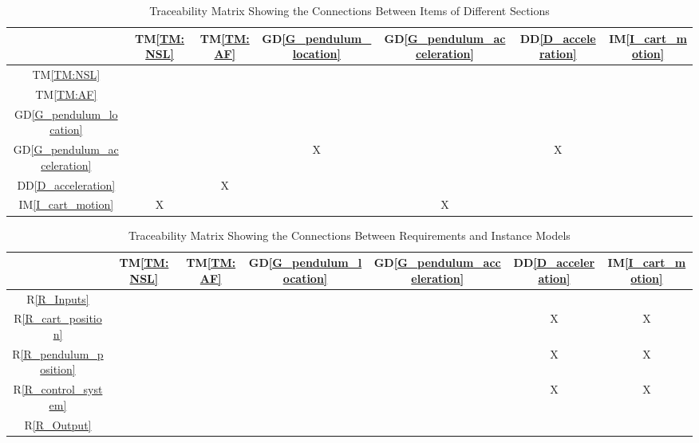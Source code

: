 \documentclass[12pt]{article}
\newcommand{\dref}[1]{GD\ref{#1}}
\newcommand{\ddref}[1]{DD\ref{#1}}
\newcommand{\tref}[1]{TM\ref{#1}}
\newcommand{\iref}[1]{IM\ref{#1}}
\newcommand{\rref}[1]{R\ref{#1}}
\begin{document}
\begin{table}[h!]
\centering
\begin{tabular}{|c|c|c|c|c|c|c|}
\hline
	& \tref{TM:NSL}& \tref{TM:AF}& \dref{G_pendulum_location}& \dref{G_pendulum_acceleration}& \ddref{D_acceleration}& \iref{I_cart_motion} \\
\hline
\tref{TM:NSL}                     & & & & & & \\ \hline
\tref{TM:AF}                      & & & & & & \\ \hline
\dref{G_pendulum_location}        & & & & & & \\ \hline
\dref{G_pendulum_acceleration}    & & &X& &X& \\ \hline
\ddref{D_acceleration}            & &X& & & & \\ \hline
\iref{I_cart_motion}              &X& & &X& & \\
\hline
\end{tabular}
\caption{Traceability Matrix Showing the Connections Between Items of Different Sections}
\label{Table:trace}
\end{table}

\begin{table}[h!]
\centering
\begin{tabular}{|c|c|c|c|c|c|c|}
\hline
	& \tref{TM:NSL}& \tref{TM:AF}& \dref{G_pendulum_location}& \dref{G_pendulum_acceleration}& \ddref{D_acceleration}& \iref{I_cart_motion} \\
\hline
\rref{R_Inputs}              & & & & & &  \\ \hline
\rref{R_cart_position}       & & & & &X&X \\ \hline
\rref{R_pendulum_position}   & & & & &X&X \\ \hline
\rref{R_control_system}      & & & & &X&X \\ \hline
\rref{R_Output}              & & & & & &  \\
\hline
\end{tabular}
\caption{Traceability Matrix Showing the Connections Between Requirements and Instance Models}
\label{Table:R_trace}
\end{table}

\end{document}

